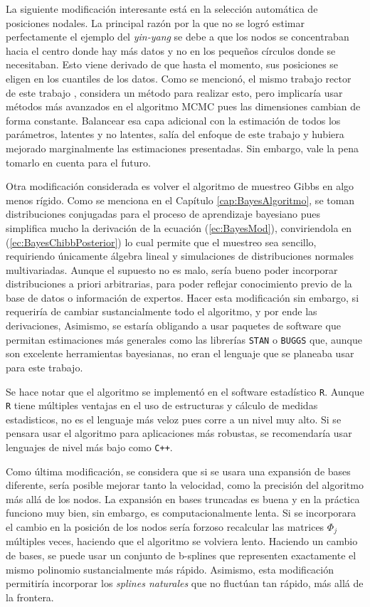 \documentclass[../Main/Main.tex]{subfiles}
\begin{document}
La siguiente modificación interesante está en la selección automática de posiciones nodales. La principal razón por la que no se logró estimar perfectamente el ejemplo del \textit{yin-yang} se debe a que los nodos se concentraban hacia el centro donde hay más datos y no en los pequeños círculos donde se necesitaban. Esto viene derivado de que hasta el momento, sus posiciones se eligen en los cuantiles de los datos. Como se mencionó, el mismo trabajo rector de este trabajo \citet{mallik1998automatic}, considera un método para realizar esto, pero implicaría usar métodos más avanzados en el algoritmo MCMC pues las dimensiones cambian de forma constante. Balancear esa capa adicional con la estimación de todos los parámetros, latentes y no latentes, salía del enfoque de este trabajo y hubiera mejorado marginalmente las estimaciones presentadas. Sin embargo, vale la pena tomarlo en cuenta para el futuro.

Otra modificación considerada es volver el algoritmo de muestreo Gibbs en algo menos rígido. Como se menciona en el Capítulo \ref{cap:BayesAlgoritmo}, se toman distribuciones conjugadas para el proceso de aprendizaje bayesiano pues simplifica mucho la derivación de la ecuación (\ref{ec:BayesMod}), conviriendola en (\ref{ec:BayesChibbPosterior}) lo cual permite que el muestreo sea sencillo, requiriendo únicamente álgebra lineal y simulaciones de distribuciones normales multivariadas. Aunque el supuesto no es malo, sería bueno poder incorporar distribuciones a priori arbitrarias, para poder reflejar conocimiento previo de la base de datos o información de expertos. Hacer esta modificación sin embargo, si requeriría de cambiar sustancialmente todo el algoritmo, y por ende las derivaciones, Asimismo, se estaría obligando a usar paquetes de software que permitan estimaciones más generales como las librerías \verb|STAN| o \verb|BUGGS| que, aunque son excelente herramientas bayesianas, no eran el lenguaje que se planeaba usar para este trabajo.

Se hace notar que el algoritmo se implementó en el software estadístico \verb|R|. Aunque \verb|R| tiene múltiples ventajas en el uso de estructuras y cálculo de medidas estadisticos, no es el lenguaje más veloz pues corre a un nivel muy alto. Si se pensara usar el algoritmo para aplicaciones más robustas, se recomendaría usar lenguajes de nivel más bajo como \verb|C++|.

Como última modificación, se considera que si se usara una expansión de bases diferente, sería posible mejorar tanto la velocidad, como la precisión del algoritmo más allá de los nodos. La expansión en bases truncadas es buena y en la práctica funciono muy bien, sin embargo, es computacionalmente lenta. Si se incorporara el cambio en la posición de los nodos sería forzoso recalcular las matrices $\Phi_j$ múltiples veces, haciendo que el algoritmo se volviera lento. Haciendo un cambio de bases, se puede usar un conjunto de b-splines que representen exactamente el mismo polinomio sustancialmente más rápido. Asimismo, esta modificación permitiría incorporar los \textit{splines naturales} que no fluctúan tan rápido, más allá de la frontera. 
\end{document}
